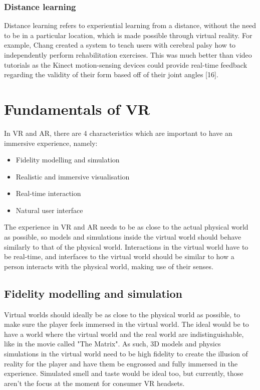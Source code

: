 \documentclass[11pt]{article}
\makeatletter
\newcommand{\cslcitation}[2]
 {\protect\hyper@linkstart{cite}{citeproc_bib_item_#1}#2\hyper@linkend}
\makeatother
\begin{document}
\subsubsection{Distance learning}
\label{sec:org669e4c0}
Distance learning refers to experiential learning from a distance, without the need to be in a particular location, which is made possible through virtual reality. For example, Chang created a system to teach users with cerebral palsy how to independently perform rehabilitation exercises. This was much better than video tutorials as the Kinect motion-sensing devices could provide real-time feedback regarding the validity of their form based off of their joint angles \cslcitation{16}{[16]}.

 \newpage
\section{Fundamentals of VR}
\label{sec:org30b2ee4}
In VR and AR, there are 4 characteristics which are important to have an immersive experience, namely:
\begin{itemize}
\item Fidelity modelling and simulation
\item Realistic and immersive visualisation
\item Real-time interaction
\item Natural user interface
\end{itemize}

The experience in VR and AR needs to be as close to the actual physical world as possible, so models and simulations inside the virtual world should behave similarly to that of the physical world. Interactions in the virtual world have to be real-time, and interfaces to the virtual world should be similar to how a person interacts with the physical world, making use of their senses.
\subsection{Fidelity modelling and simulation}
\label{sec:orgfa529b8}
Virtual worlds should ideally be as close to the physical world as possible, to make sure the player feels immersed in the virtual world. The ideal would be to have a world where the virtual world and the real world are indistinguishable, like in the movie called "The Matrix". As such, 3D models and physics simulations in the virtual world need to be high fidelity to create the illusion of reality for the player and have them be engrossed and fully immersed in the experience. Simulated smell and taste would be ideal too, but currently, those aren't the focus at the moment for consumer VR headsets.
\end{document}
